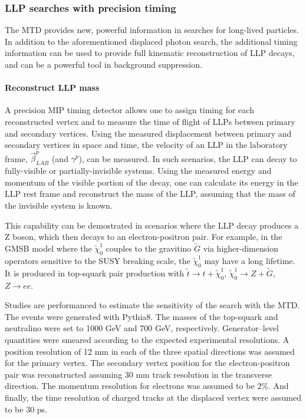 \subsubsection{LLP searches with precision timing}

The MTD provides new, powerful information in searches for long-lived particles. 
In addition to the aforementioned displaced photon search, the additional timing information can be used to provide full kinematic reconstruction of LLP decays, and can be a powerful tool in background suppression. 

\paragraph{Reconstruct LLP mass}
A precision MIP timing detector allows one to assign timing for each reconstructed vertex and to measure the time of flight of LLPs between primary and secondary vertices. 
Using the measured displacement between primary and secondary vertices in space and time, the velocity of an LLP in
the laboratory frame, $\vec{\beta}_{LAB}^{p}$ (and $\gamma^p$), can be measured. In such scenarios, the LLP can decay to fully-visible or partially-invisible systems. 
Using the measured energy and momentum of the visible portion of the decay, one can calculate its energy in the LLP rest frame and reconstruct the mass of the LLP, assuming that the mass of the invisible system is known. 

This capability can be demostrated in scenarios where the LLP decay produces a Z boson, which then decays to an electron-positron pair.
For example, in the GMSB model where the $\tilde{\chi}_0^1$ couples
to the gravitino $\tilde{G}$ via higher-dimension operators sensitive to the SUSY breaking scale, the $\tilde{\chi}_0^1$ may have a long lifetime. 
It is produced in top-squark pair production with 
$\tilde{t}\to t+\tilde{\chi}_0^1$, $\tilde{\chi}_0^1 \to Z+\tilde{G}$, $Z\to ee$.

Studies are performanced to estimate the sensitivity of the search with the MTD.
The events were generated with Pythia8. The masses of the top-squark and neutralino were set to 1000 GeV and 700 GeV, respectively. 
Generator–level quantities were smeared according to the expected experimental resolutions. 
A position resolution of 12 mm in each of the three spatial directions was assumed for the primary vertex.
 The secondary vertex position for the electron-positron pair was reconstructed assuming 30 mm track resolution in the transverse direction. 
The momentum resolution for electrons was assumed to be $2\%$. 
And finally, the time resolution of charged tracks at the displaced vertex were assumed to be 30 ps.

